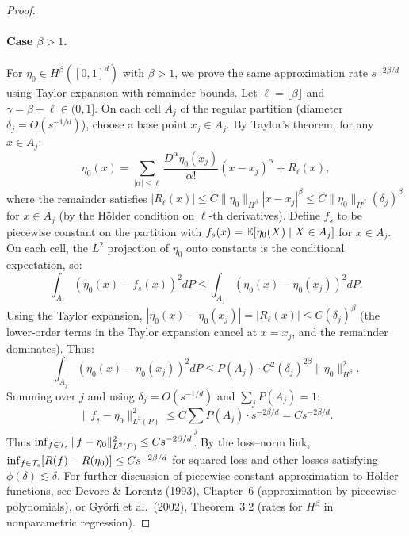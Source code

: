 \documentclass[12pt]{article}
\begin{document}
\begin{proof}
\paragraph{Case $\beta > 1$.}
For $\eta_0 \in H^\beta([0,1]^d)$ with $\beta > 1$, we prove the same approximation rate $s^{-2\beta/d}$ using Taylor expansion with remainder bounds. Let $\ell = \lfloor \beta \rfloor$ and $\gamma = \beta - \ell \in (0,1]$. On each cell $A_j$ of the regular partition (diameter $\delta_j = O(s^{-1/d})$), choose a base point $x_j \in A_j$. By Taylor's theorem, for any $x \in A_j$:
\[
\eta_0(x) = \sum_{|\alpha| \le \ell} \frac{D^\alpha \eta_0(x_j)}{\alpha!} (x - x_j)^\alpha + R_\ell(x),
\]
where the remainder satisfies $|R_\ell(x)| \le C \|\eta_0\|_{H^\beta} |x - x_j|^\beta \le C \|\eta_0\|_{H^\beta} (\delta_j)^\beta$ for $x \in A_j$ (by the Hölder condition on $\ell$-th derivatives). Define $f_s$ to be piecewise constant on the partition with $f_s(x) = \mathbb{E}[\eta_0(X) \mid X \in A_j]$ for $x \in A_j$. On each cell, the $L^2$ projection of $\eta_0$ onto constants is the conditional expectation, so:
\[
\int_{A_j} (\eta_0(x) - f_s(x))^2 dP \le \int_{A_j} (\eta_0(x) - \eta_0(x_j))^2 dP.
\]
Using the Taylor expansion, $|\eta_0(x) - \eta_0(x_j)| = |R_\ell(x)| \le C(\delta_j)^\beta$ (the lower-order terms in the Taylor expansion cancel at $x = x_j$, and the remainder dominates). Thus:
\[
\int_{A_j} (\eta_0(x) - \eta_0(x_j))^2 dP \le P(A_j) \cdot C^2 (\delta_j)^{2\beta} \|\eta_0\|_{H^\beta}^2.
\]
Summing over $j$ and using $\delta_j = O(s^{-1/d})$ and $\sum_j P(A_j) = 1$:
\[
\|f_s - \eta_0\|_{L^2(P)}^2 \le C \sum_j P(A_j) \cdot s^{-2\beta/d} = C s^{-2\beta/d}.
\]
Thus $\inf_{f \in \mathcal{T}_s} \|f - \eta_0\|_{L^2(P)}^2 \le C s^{-2\beta/d}$. By the loss--norm link, $\inf_{f \in \mathcal{T}_s} [R(f) - R(\eta_0)] \le C s^{-2\beta/d}$ for squared loss and other losses satisfying $\phi(\delta) \lesssim \delta$. For further discussion of piecewise-constant approximation to Hölder functions, see Devore \& Lorentz (1993), Chapter~6 (approximation by piecewise polynomials), or Györfi et al.\ (2002), Theorem~3.2 (rates for $H^\beta$ in nonparametric regression).
\end{proof}
\end{document}
